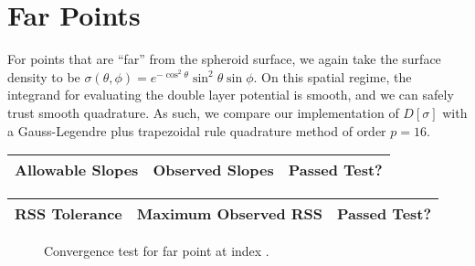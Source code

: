\documentclass[12pt]{article}
\begin{document}
\section*{Far Points}
For points that are ``far'' from the spheroid surface, we again take the surface density to be $\sigma(\theta,\phi)=e^{-\cos^2\theta} \sin^2\theta \sin\phi$.
On this spatial regime, the integrand for evaluating the double layer potential is smooth, and we can safely trust smooth quadrature. 
As such, we compare our implementation of $D[\sigma]$ with a Gauss-Legendre plus trapezoidal rule quadrature method of order $p=16$.

\begin{center}
\def\arraystretch{1.5}
\begin{tabular}{|c|c|c|}
    \hline
    Allowable Slopes & Observed Slopes & Passed Test?\\
    \hline
    
    \hline
\end{tabular}
\end{center}

\begin{center}
\def\arraystretch{1.5}
\begin{tabular}{|c|c|c|}
    \hline
    RSS Tolerance & Maximum Observed RSS & Passed Test?\\
    \hline
    
    \hline
\end{tabular}
\end{center}

\begin{figure}[!ht]
    \centering
    \caption{Convergence test for far point at index \protect.}
\end{figure}

\pagebreak
\end{document}

